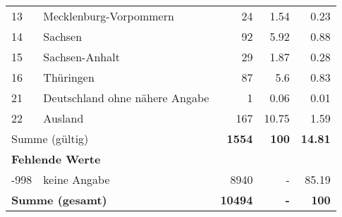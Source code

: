 \begin{longtable}{lXrrr}
     13 &
     \multicolumn{1}{X}{ Mecklenburg-Vorpommern   } &


       \num{24} &
       \num[round-mode=places,round-precision=2]{1,54} &
         \num[round-mode=places,round-precision=2]{0,23} \\

     14 &
     \multicolumn{1}{X}{ Sachsen   } &


       \num{92} &
       \num[round-mode=places,round-precision=2]{5,92} &
         \num[round-mode=places,round-precision=2]{0,88} \\

     15 &
     \multicolumn{1}{X}{ Sachsen-Anhalt   } &


       \num{29} &
       \num[round-mode=places,round-precision=2]{1,87} &
         \num[round-mode=places,round-precision=2]{0,28} \\

     16 &
     \multicolumn{1}{X}{ Thüringen   } &


       \num{87} &
       \num[round-mode=places,round-precision=2]{5,6} &
         \num[round-mode=places,round-precision=2]{0,83} \\

     21 &
     \multicolumn{1}{X}{ Deutschland ohne nähere Angabe   } &


       \num{1} &
       \num[round-mode=places,round-precision=2]{0,06} &
         \num[round-mode=places,round-precision=2]{0,01} \\

     22 &
     \multicolumn{1}{X}{ Ausland   } &


       \num{167} &
       \num[round-mode=places,round-precision=2]{10,75} &
         \num[round-mode=places,round-precision=2]{1,59} \\
     \midrule
     \multicolumn{2}{l}{Summe (gültig)} &
       \textbf{\num{1554}} &
     \textbf{100} &
       \textbf{\num[round-mode=places,round-precision=2]{14,81}} \\
     \multicolumn{5}{l}{\textbf{Fehlende Werte}}\\
       -998 &
       keine Angabe &
         \num{8940} &
        - &
         \num[round-mode=places,round-precision=2]{85,19} \\
     \midrule
     \multicolumn{2}{l}{\textbf{Summe (gesamt)}} &
          \textbf{\num{10494}} &
        \textbf{-} &
        \textbf{100} \\
     \bottomrule
     \end{longtable}
     
